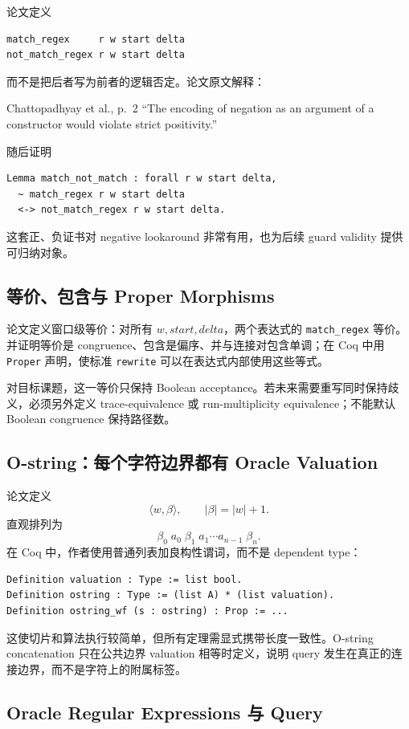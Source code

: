 \documentclass[UTF8,a4paper,12pt]{ctexart}
\begin{document}
论文定义
\begin{lstlisting}
match_regex     r w start delta
not_match_regex r w start delta
\end{lstlisting}
而不是把后者写为前者的逻辑否定。论文原文解释：
\begin{paperquote}{Chattopadhyay et al., p.~2}
``The encoding of negation as an argument of a constructor would violate strict positivity.''
\end{paperquote}
随后证明
\begin{lstlisting}
Lemma match_not_match : forall r w start delta,
  ~ match_regex r w start delta
  <-> not_match_regex r w start delta.
\end{lstlisting}
这套正、负证书对 negative lookaround 非常有用，也为后续 guard validity 提供可归纳对象。

\subsection{等价、包含与 Proper Morphisms}

论文定义窗口级等价：对所有 $w,start,delta$，两个表达式的 \texttt{match\_regex} 等价。并证明等价是 congruence、包含是偏序、并与连接对包含单调；在 Coq 中用 \texttt{Proper} 声明，使标准 \texttt{rewrite} 可以在表达式内部使用这些等式\cite[p.~3]{chattopadhyay2025}。

对目标课题，这一等价只保持 Boolean acceptance。若未来需要重写同时保持歧义，必须另外定义 trace-equivalence 或 run-multiplicity equivalence；不能默认 Boolean congruence 保持路径数。

\subsection{O-string：每个字符边界都有 Oracle Valuation}

论文定义
\[
\langle w,\beta\rangle,
\qquad |\beta|=|w|+1.
\]
直观排列为
\[
\beta_0\;a_0\;\beta_1\;a_1\cdots a_{n-1}\;\beta_n.
\]
在 Coq 中，作者使用普通列表加良构性谓词，而不是 dependent type：
\begin{lstlisting}
Definition valuation : Type := list bool.
Definition ostring : Type := (list A) * (list valuation).
Definition ostring_wf (s : ostring) : Prop := ...
\end{lstlisting}
这使切片和算法执行较简单，但所有定理需显式携带长度一致性。O-string concatenation 只在公共边界 valuation 相等时定义，说明 query 发生在真正的连接边界，而不是字符上的附属标签。

\subsection{Oracle Regular Expressions 与 Query}
\end{document}

